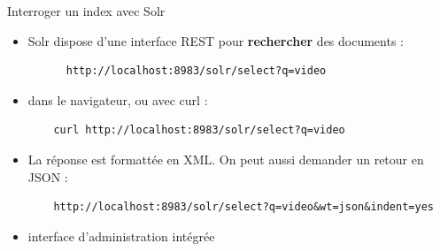 

\begin{frame}[fragile]{Interroger un index avec Solr}
  \begin{itemize}
    \item Solr dispose d'une interface REST pour {\bf rechercher} des documents :\\
\begin{verbatim}
      http://localhost:8983/solr/select?q=video
\end{verbatim}
  \item dans le navigateur, ou avec curl :\\
\begin{verbatim}
    curl http://localhost:8983/solr/select?q=video
\end{verbatim}
\item La réponse est formattée en XML. On peut aussi demander un retour en JSON :\\
\begin{verbatim}
    http://localhost:8983/solr/select?q=video&wt=json&indent=yes
\end{verbatim}
  \item interface d'administration intégrée
  \end{itemize}
\end{frame}

